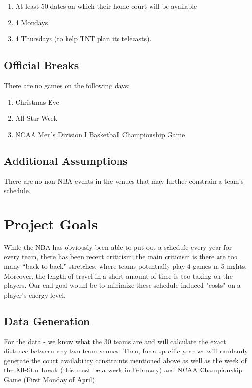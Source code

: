 \documentclass{article}
\begin{document}
	\begin{enumerate}
		\item At least 50 dates on which their home court will be available
		\item 4 Mondays
		\item 4 Thursdays (to help TNT plan its telecasts).
	\end{enumerate}

	\subsection{Official Breaks}

	There are no games on the following days:

	\begin{enumerate}
		\item Christmas Eve
		\item All-Star Week
		\item NCAA Men's Division I Basketball Championship Game
	\end{enumerate}

    \subsection{Additional Assumptions}
    
    There are no non-NBA events in the venues that may further constrain a team's schedule.
	
	\section{Project Goals}

	While the NBA has obviously been able to put out a schedule every year for every team, there has been recent criticism; the main criticism is there are too many ``back-to-back'' stretches, where teams potentially play 4 games in 5 nights.  Moreover, the length of travel in a short amount of time is too taxing on the players. Our end-goal would be to minimize these schedule-induced "costs" on a player's energy level.
	
	\subsection{Data Generation}
	For the data - we know what the 30 teams are and will calculate the exact distance between any two team venues. Then, for a specific year we will randomly generate the court availability constraints mentioned above as well as the week of the All-Star break (this must be a week in February) and NCAA Championship Game (First Monday of April).
\end{document}
